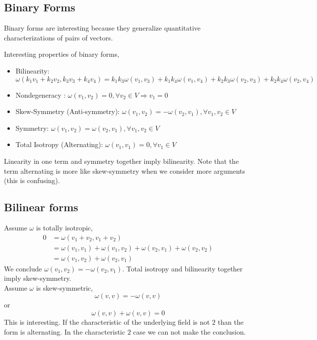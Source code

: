 \documentclass[a4paper]{scrartcl}
\begin{document}
\subsection{Binary Forms}
Binary forms are interesting because they generalize quantitative characterizations of pairs of vectors.

Interesting properties of binary forms,
\begin{itemize}
\item{Bilinearity: $\omega (k_{1}v_{1} + k_{2}v_{2}, k_{3}v_{3} + k_{4}v_{4}) = 
k_{1}k_{3}\omega (v_{1},v_{3}) + k_{1}k_{4}\omega (v_{1},v_{4}) +
k_{2}k_{3}\omega (v_{2},v_{3}) + k_{2}k_{4}\omega (v_{2},v_{4})$}
\item{Nondegeneracy : $\omega (v_{1},v_{2}) = 0, \forall v_{2}\in V \Rightarrow v_{1} = 0$}
\item{Skew-Symmetry (Anti-symmetry): $\omega (v_{1},v_{2}) = 
-\omega (v_{2},v_{1}), \forall v_{1}, v_{2}\in V$}
\item{Symmetry: $\omega (v_{1},v_{2}) = \omega(v_{2},v_{1}), \forall v_{1}, v_{2}\in V$}
\item{Total Isotropy (Alternating): $\omega (v_{1},v_{1}) = 0, \forall v_{1}\in V$}
\end{itemize}
Linearity in one term and symmetry together imply bilinearity. Note that the term alternating is more like skew-symmetry when we consider more arguments (this is confusing).

\subsection{Bilinear forms}
Assume $\omega$ is totally isotropic,
\begin{align*}
0 & = \omega (v_{1} + v_{2}, v_{1} + v_{2}) \\
& = \omega (v_{1},v_{1}) + \omega (v_{1}, v_{2}) + \omega (v_{2}, v_{1}) + \omega (v_{2}, v_{2}) \\
& = \omega (v_{1}, v_{2}) + \omega (v_{2}, v_{1})
\end{align*}
We conclude $\omega (v_{1}, v_{2}) = - \omega (v_{2}, v_{1})$. Total isotropy and bilinearity together imply skew-symmetry. \\
Assume $\omega$ is skew-symmetric,
$$\omega (v, v) = - \omega (v, v)$$
or
$$\omega (v, v) + \omega (v, v) = 0$$
This is interesting. If the characteristic of the underlying field is not $2$ than the form is alternating. In the characteristic $2$ case we can not make the conclusion. 
\end{document}
